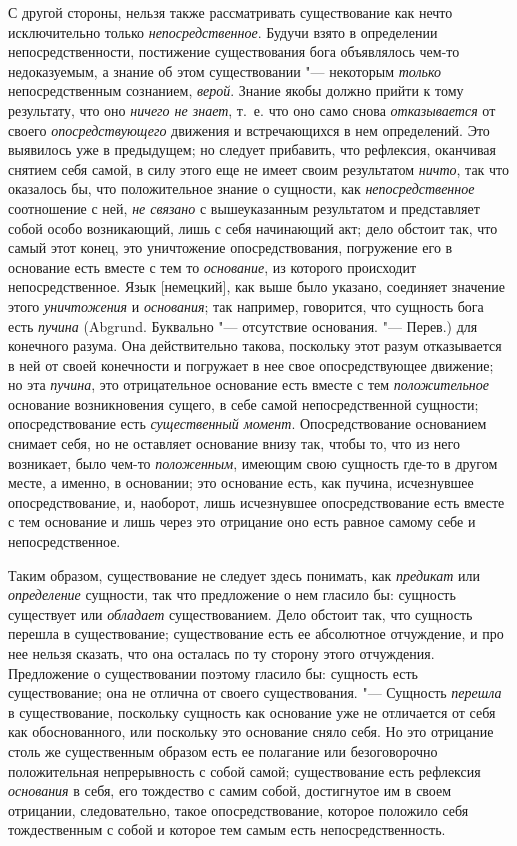 С другой стороны, нельзя также рассматривать существование как нечто
исключительно только {\em непосредственное}. Будучи
взято в определении непосредственности, постижение существования бога
объявлялось чем-то недоказуемым, а знание об этом существовании "--- некоторым
{\em только} непосредственным сознанием,
{\em верой}. Знание якобы должно прийти к тому
результату, что оно {\em ничего не знает}, т.~е. что
оно само снова {\em отказывается} от своего
{\em опосредствующего} движения и встречающихся в нем
определений. Это выявилось уже в предыдущем; но следует прибавить, что
рефлексия, оканчивая снятием себя самой, в силу этого еще не имеет своим
результатом {\em ничто}, так что оказалось бы, что
положительное знание о сущности, как
{\em непосредственное} соотношение с ней,
{\em не связано} с вышеуказанным результатом и
представляет собой особо возникающий, лишь с себя начинающий акт; дело
обстоит так, что самый этот конец, это уничтожение опосредствования,
погружение его в основание есть вместе с тем то
{\em основание}, из которого происходит
непосредственное. Язык [немецкий], как выше было указано, соединяет
значение этого {\em уничтожения} и
{\em основания}; так например, говорится, что сущность
бога есть {\em пучина} (Abgrund. Буквально "--- отсутствие
основания. "--- Перев.) для конечного разума. Она действительно такова,
поскольку этот разум отказывается в ней от своей конечности и погружает в
нее свое опосредствующее движение; но эта {\em пучина},
это отрицательное основание есть вместе с тем
{\em положительное} основание возникновения сущего, в
себе самой непосредственной сущности; опосредствование есть
{\em существенный момент}. Опосредствование основанием
снимает себя, но не оставляет основание внизу так, чтобы то, что из него
возникает, было чем-то {\em положенным}, имеющим свою
сущность где-то в другом месте, а именно, в основании; это основание есть,
как пучина, исчезнувшее опосредствование, и, наоборот, лишь исчезнувшее
опосредствование есть вместе с тем основание и лишь через это отрицание оно
есть равное самому себе и непосредственное.

Таким образом, существование не следует здесь понимать, как
{\em предикат} или
{\em определение} сущности, так что предложение о нем
гласило бы: сущность существует или {\em обладает}
существованием. Дело обстоит так, что сущность перешла в существование;
существование есть ее абсолютное отчуждение, и про нее нельзя сказать, что
она осталась по ту сторону этого отчуждения. Предложение о существовании
поэтому гласило бы: сущность есть существование; она не отлична от своего
существования. "--- Сущность {\em перешла} в
существование, поскольку сущность как основание уже не отличается от себя
как обоснованного, или поскольку это основание сняло себя. Но это отрицание
столь же существенным образом есть ее полагание или безоговорочно
положительная непрерывность с собой самой; существование есть рефлексия
{\em основания} в себя, его тождество с самим собой,
достигнутое им в своем отрицании, следовательно, такое опосредствование,
которое положило себя тождественным с собой и которое тем самым есть
непосредственность.

